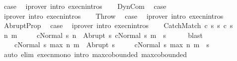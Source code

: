\begin{isabellebody}
\ {\isacharquery}case\ \isamarkupfalse%
\ {\isacharparenleft}iprover\ intro{\isacharcolon}\ execn{\isachardot}intros{\isacharparenright}\isanewline
{}\isamarkupfalse%
\isanewline
\ \ \isamarkupfalse%
\ DynCom\ \isamarkupfalse%
\ {\isacharquery}case\ \isamarkupfalse%
\ {\isacharparenleft}iprover\ intro{\isacharcolon}\ execn{\isachardot}intros{\isacharparenright}\isanewline
{}\isamarkupfalse%
\isanewline
\ \ \isamarkupfalse%
\ Throw\ \isamarkupfalse%
\ {\isacharquery}case\ \isamarkupfalse%
\ {\isacharparenleft}iprover\ intro{\isacharcolon}\ execn{\isachardot}intros{\isacharparenright}\isanewline
{}\isamarkupfalse%
\isanewline
\ \ \isamarkupfalse%
\ AbruptProp\ \isamarkupfalse%
\ {\isacharquery}case\ \isamarkupfalse%
\ {\isacharparenleft}iprover\ intro{\isacharcolon}\ execn{\isachardot}intros{\isacharparenright}\isanewline
{}\isamarkupfalse%
\isanewline
\ \ \isamarkupfalse%
\ {\isacharparenleft}CatchMatch\ c{}\ s\ s{\isacharprime}\ c{}\ s{\isacharprime}{\isacharprime}{\isacharparenright}\isanewline
\ \ \isamarkupfalse%
\ \isamarkupfalse%
\ n\ m\ \isanewline
\ \ \ \ {\isachardoublequoteopen}{\isasymGamma}{\isasymturnstile}{\isasymlangle}c{}{\isacharcomma}Normal\ s{\isasymrangle}\ {\isacharequal}n{\isasymRightarrow}\ \ Abrupt\ s{\isacharprime}{\isachardoublequoteclose}\ {\isachardoublequoteopen}{\isasymGamma}{\isasymturnstile}{\isasymlangle}c{}{\isacharcomma}Normal\ s{\isacharprime}{\isasymrangle}\ {\isacharequal}m{\isasymRightarrow}\ \ s{\isacharprime}{\isacharprime}{\isachardoublequoteclose}\isanewline
\ \ \ \ \isamarkupfalse%
\ blast\isanewline
\ \ \isamarkupfalse%
\ \isamarkupfalse%
\ \isanewline
\ \ \ \ {\isachardoublequoteopen}{\isasymGamma}{\isasymturnstile}{\isasymlangle}c{}{\isacharcomma}Normal\ s{\isasymrangle}\ {\isacharequal}max\ n\ m{\isasymRightarrow}\ \ Abrupt\ s{\isacharprime}{\isachardoublequoteclose}\ \isanewline
\ \ \ \ {\isachardoublequoteopen}{\isasymGamma}{\isasymturnstile}{\isasymlangle}c{}{\isacharcomma}Normal\ s{\isacharprime}{\isasymrangle}\ {\isacharequal}max\ n\ m{\isasymRightarrow}\ \ s{\isacharprime}{\isacharprime}{\isachardoublequoteclose}\isanewline
\ \ \ \ \isamarkupfalse%
\ {\isacharparenleft}auto\ elim{\isacharbang}{\isacharcolon}\ execn{\isacharunderscore}mono\ intro{\isacharcolon}\ max{\isachardot}cobounded{}\ max{\isachardot}cobounded{}{\isacharparenright}\isanewline

\end{isabellebody}

